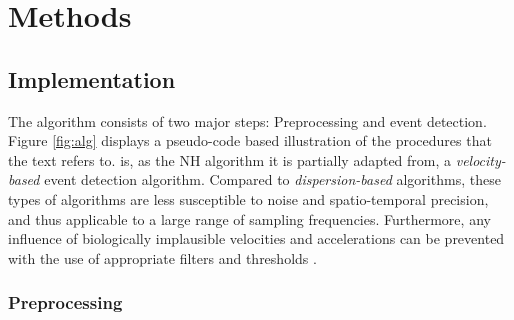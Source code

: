 

\section*{Methods}\label{methods}


\subsection*{\remodnav Implementation}\label{impl}
 

The algorithm consists of two major steps: Preprocessing and event detection. Figure \ref{fig:alg} displays a pseudo-code based illustration of the procedures that the text refers to. \remodnav is, as the NH algorithm it is partially adapted from, a \textit{velocity-based} event detection algorithm. Compared to \textit{dispersion-based} algorithms, these types of algorithms are less susceptible to noise and spatio-temporal precision, and thus applicable to a large range of sampling frequencies. Furthermore, any influence of biologically implausible velocities and accelerations can be prevented with the use of appropriate filters and thresholds \citep{holmqvist2011eye}.

\subsubsection*{Preprocessing}

